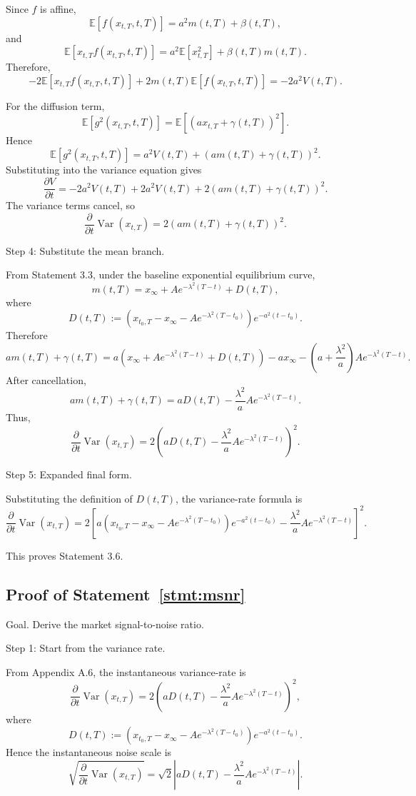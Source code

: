 \documentclass[12pt]{article}
\theoremstyle{statementstyle}
\begin{document}
\begin{appendices}
Since \(f\) is affine,
\[
\mathbb E[f(x_{t,T},t,T)]
=
a^2m(t,T)+\beta(t,T),
\]
and
\[
\mathbb E[x_{t,T}f(x_{t,T},t,T)]
=
a^2\mathbb E[x_{t,T}^2]+\beta(t,T)m(t,T).
\]
Therefore,
\[
-2\mathbb E[x_{t,T}f(x_{t,T},t,T)]
+
2m(t,T)\mathbb E[f(x_{t,T},t,T)]
=
-2a^2V(t,T).
\]

For the diffusion term,
\[
\mathbb E[g^2(x_{t,T},t,T)]
=
\mathbb E[(ax_{t,T}+\gamma(t,T))^2].
\]
Hence
\[
\mathbb E[g^2(x_{t,T},t,T)]
=
a^2V(t,T)
+
\left(am(t,T)+\gamma(t,T)\right)^2.
\]
Substituting into the variance equation gives
\[
\frac{\partial V}{\partial t}
=
-2a^2V(t,T)
+
2a^2V(t,T)
+
2\left(am(t,T)+\gamma(t,T)\right)^2.
\]
The variance terms cancel, so
\[
\frac{\partial}{\partial t}\operatorname{Var}(x_{t,T})
=
2\left(am(t,T)+\gamma(t,T)\right)^2.
\]

Step 4: Substitute the mean branch.

From Statement 3.3, under the baseline exponential equilibrium curve,
\[
m(t,T)
=
x_\infty
+
Ae^{-\lambda^2(T-t)}
+
D(t,T),
\]
where
\[
D(t,T)
:=
\left(
x_{t_0,T}
-
x_\infty
-
Ae^{-\lambda^2(T-t_0)}
\right)
e^{-a^2(t-t_0)}.
\]
Therefore
\[
am(t,T)+\gamma(t,T)
=
a\left(x_\infty+Ae^{-\lambda^2(T-t)}+D(t,T)\right)
-
ax_\infty
-
\left(a+\frac{\lambda^2}{a}\right)Ae^{-\lambda^2(T-t)}.
\]
After cancellation,
\[
am(t,T)+\gamma(t,T)
=
aD(t,T)
-
\frac{\lambda^2}{a}Ae^{-\lambda^2(T-t)}.
\]
Thus,
\[
\frac{\partial}{\partial t}\operatorname{Var}(x_{t,T})
=
2\left(
aD(t,T)
-
\frac{\lambda^2}{a}Ae^{-\lambda^2(T-t)}
\right)^2.
\]

Step 5: Expanded final form.

Substituting the definition of \(D(t,T)\), the variance-rate formula is
\[
\boxed{
\frac{\partial}{\partial t}\operatorname{Var}(x_{t,T})
=
2\left[
a\left(
x_{t_0,T}
-
x_\infty
-
Ae^{-\lambda^2(T-t_0)}
\right)
e^{-a^2(t-t_0)}
-
\frac{\lambda^2}{a}Ae^{-\lambda^2(T-t)}
\right]^2.
}
\label{eq:interim_inst_variance}\tag{A.6.1}
\]


This proves Statement 3.6.
\subsection{Proof of Statement~\ref{stmt:msnr}}
\label{appendix:A7}

Goal. Derive the market signal-to-noise ratio.

Step 1: Start from the variance rate.

From Appendix A.6, the instantaneous variance-rate is
\[
\frac{\partial}{\partial t}\operatorname{Var}(x_{t,T})
=
2\left(
aD(t,T)
-
\frac{\lambda^2}{a}Ae^{-\lambda^2(T-t)}
\right)^2,
\]
where
\[
D(t,T)
:=
\left(
x_{t_0,T}
-
x_\infty
-
Ae^{-\lambda^2(T-t_0)}
\right)
e^{-a^2(t-t_0)}.
\]
Hence the instantaneous noise scale is
\[
\sqrt{
\frac{\partial}{\partial t}\operatorname{Var}(x_{t,T})
}
=
\sqrt{2}
\left|
aD(t,T)
-
\frac{\lambda^2}{a}Ae^{-\lambda^2(T-t)}
\right|.
\]


\end{appendices}
\end{document}
